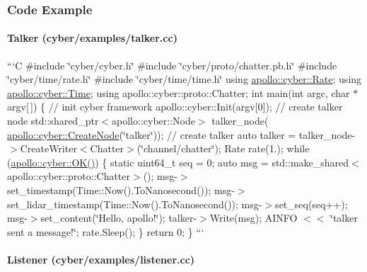 \subsubsection*{Code Example}

\paragraph*{Talker (cyber/examples/talker.\-cc)}

```\-C \#include \char`\"{}cyber/cyber.\-h\char`\"{} \#include \char`\"{}cyber/proto/chatter.\-pb.\-h\char`\"{} \#include \char`\"{}cyber/time/rate.\-h\char`\"{} \#include \char`\"{}cyber/time/time.\-h\char`\"{} using \hyperlink{classapollo_1_1cyber_1_1Rate}{apollo\-::cyber\-::\-Rate}; using \hyperlink{classapollo_1_1cyber_1_1Time}{apollo\-::cyber\-::\-Time}; using apollo\-::cyber\-::proto\-::\-Chatter; int main(int argc, char $\ast$argv\mbox{[}$\,$\mbox{]}) \{ // init cyber framework apollo\-::cyber\-::\-Init(argv\mbox{[}0\mbox{]}); // create talker node std\-::shared\-\_\-ptr$<$apollo\-::cyber\-::\-Node$>$ talker\-\_\-node( \hyperlink{namespaceapollo_1_1cyber_ae369c5de0279f2a5745d0438d532bc89}{apollo\-::cyber\-::\-Create\-Node}(\char`\"{}talker\char`\"{})); // create talker auto talker = talker\-\_\-node-\/$>$Create\-Writer$<$\-Chatter$>$(\char`\"{}channel/chatter\char`\"{}); Rate rate(1.); while (\hyperlink{namespaceapollo_1_1cyber_aafa5f9962b51918897897bbc0fdd802f}{apollo\-::cyber\-::\-O\-K()}) \{ static uint64\-\_\-t seq = 0; auto msg = std\-::make\-\_\-shared$<$apollo\-::cyber\-::proto\-::\-Chatter$>$(); msg-\/$>$set\-\_\-timestamp(Time\-::\-Now().To\-Nanosecond()); msg-\/$>$set\-\_\-lidar\-\_\-timestamp(Time\-::\-Now().To\-Nanosecond()); msg-\/$>$set\-\_\-seq(seq++); msg-\/$>$set\-\_\-content(\char`\"{}\-Hello, apollo!\char`\"{}); talker-\/$>$Write(msg); A\-I\-N\-F\-O $<$$<$ \char`\"{}talker sent a message!\char`\"{}; rate.\-Sleep(); \} return 0; \} ```

\paragraph*{Listener (cyber/examples/listener.\-cc)}

